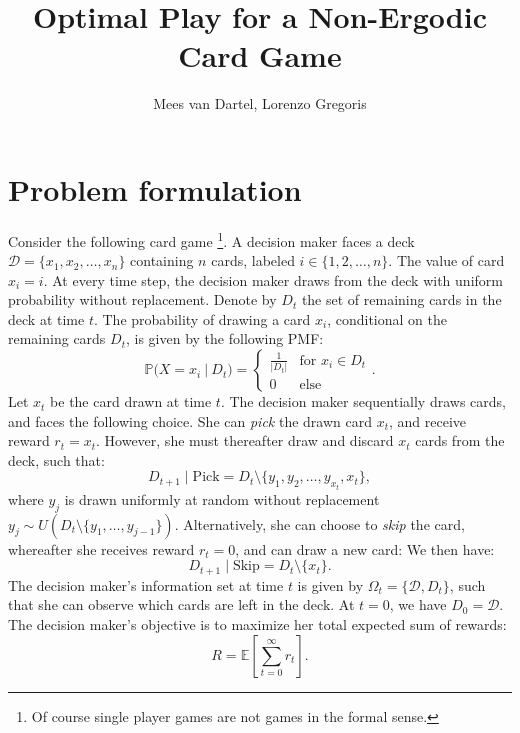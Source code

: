 \documentclass{article}
\title{Optimal Play for a Non-Ergodic Card Game}
\author{Mees van Dartel, Lorenzo Gregoris}
\begin{document}
\maketitle
\section{Problem formulation}
Consider the following card game \footnote{Of course single player games are not games in the formal sense.}. A decision maker faces a deck $\mathcal{D} = \{x_1, x_2, \dots, x_n\}$ containing $n$ cards, labeled $i \in \{1, 2, \dots, n\}$.
The value of card $x_i=i$. At every time step, the decision maker draws from the deck with uniform probability without replacement.
Denote by $D_t$ the set of remaining cards in the deck at time $t$. The probability of drawing a card $x_i$, conditional on the remaining cards $D_t$, is given by the following PMF:
\begin{equation}
    \mathbb{P}\Big(X=x_i \ \big| \  D_t\Big) =\begin{cases}
        \frac{1}{|D_t|} & \text{for } x_i \in D_t \\
        0               & \text{else}
    \end{cases}.
\end{equation}
Let $x_t$ be the card drawn at time $t$.
The decision maker sequentially draws cards, and faces the following choice. She can \textit{pick} the drawn card $x_t$, and receive reward $r_t=x_t$. However, she must thereafter draw and discard $x_t$ cards from the deck, such that:
\begin{equation}
    D_{t+1} \mid \text{Pick} = D_{t}  \setminus \{y_1, y_2, \ldots, y_{x_t}, x_t\},
\end{equation}
where $y_j$ is drawn uniformly at random without replacement $y_j \sim U(D_t \setminus \{y_1, \dots, y_{j-1}\})$. Alternatively, she can choose to \textit{skip} the card, whereafter she receives reward $r_t=0$, and can draw a new card:
We then have:
\begin{equation}
    D_{t+1} \mid \text{Skip} = D_{t} \setminus \{x_t\}.
\end{equation}
The decision maker's information set at time $t$ is given by $\Omega_t = \{\mathcal{D}, D_t\}$, such that she can observe which cards are left in the deck. At $t=0$, we have $ D_0 = \mathcal{D}$. The decision maker's objective is to maximize her total expected sum of rewards:
\begin{equation}
    R=\mathbb{E}\left[\sum_{t=0}^\infty r_t\right].
\end{equation}
\end{document}
